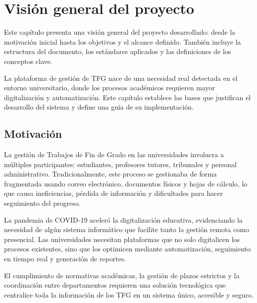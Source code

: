 \documentclass[12pt,a4paper,oneside]{report}
\begin{document}


\renewcommand{\contentsname}{Índice}
\thispagestyle{plain}
\tableofcontents
\clearpage

\renewcommand{\listfigurename}{Lista de Figuras}
\thispagestyle{plain}
\listoffigures
\clearpage

\markboth{}{}

\setcounter{chapter}{0}

\chapter{Visión general del
proyecto}\label{visiuxf3n-general-del-proyecto}
Este capítulo presenta una visión general del proyecto desarrollado: desde la motivación inicial hasta los objetivos y el alcance definido. También incluye la estructura del documento, los estándares aplicados y las definiciones de los conceptos clave.

La plataforma de gestión de TFG nace de una necesidad real detectada en el entorno universitario, donde los procesos académicos requieren mayor digitalización y automatización. Este capítulo establece las bases que justifican el desarrollo del sistema y define una guía de su implementación.

\section{Motivación}\label{motivaciuxf3n}

La gestión de Trabajos de Fin de Grado en las universidades involucra a múltiples participantes: estudiantes, profesores tutores, tribunales y personal administrativo. Tradicionalmente, este proceso se gestionaba de forma fragmentada usando correo electrónico, documentos físicos y hojas de cálculo, lo que causa ineficiencias, pérdida de información y dificultades para hacer seguimiento del progreso.

La pandemia de COVID-19 aceleró la digitalización educativa, evidenciando la necesidad de algún sistema informático que facilite tanto la gestión remota como presencial. Las universidades necesitan plataformas que no solo digitalicen los procesos existentes, sino que los optimicen mediante automatización, seguimiento en tiempo real y generación de reportes.

El cumplimiento de normativas académicas, la gestión de plazos estrictos y la coordinación entre departamentos requieren una solución tecnológica que centralice toda la información de los TFG en un sistema único, accesible y seguro.
\end{document}
